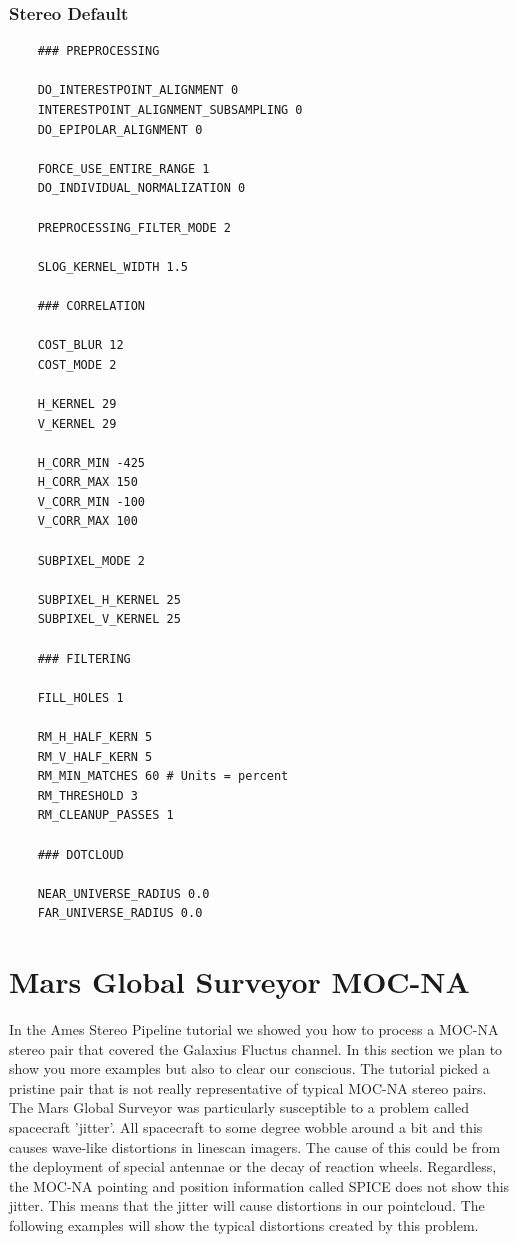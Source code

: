 \subsubsection*{Stereo Default}

\begin{verbatim}
    ### PREPROCESSING

    DO_INTERESTPOINT_ALIGNMENT 0
    INTERESTPOINT_ALIGNMENT_SUBSAMPLING 0
    DO_EPIPOLAR_ALIGNMENT 0

    FORCE_USE_ENTIRE_RANGE 1
    DO_INDIVIDUAL_NORMALIZATION 0

    PREPROCESSING_FILTER_MODE 2

    SLOG_KERNEL_WIDTH 1.5

    ### CORRELATION

    COST_BLUR 12
    COST_MODE 2

    H_KERNEL 29
    V_KERNEL 29

    H_CORR_MIN -425
    H_CORR_MAX 150
    V_CORR_MIN -100
    V_CORR_MAX 100

    SUBPIXEL_MODE 2

    SUBPIXEL_H_KERNEL 25
    SUBPIXEL_V_KERNEL 25

    ### FILTERING

    FILL_HOLES 1

    RM_H_HALF_KERN 5
    RM_V_HALF_KERN 5
    RM_MIN_MATCHES 60 # Units = percent
    RM_THRESHOLD 3
    RM_CLEANUP_PASSES 1

    ### DOTCLOUD

    NEAR_UNIVERSE_RADIUS 0.0
    FAR_UNIVERSE_RADIUS 0.0
\end{verbatim}

\section{Mars Global Surveyor MOC-NA}

In the Ames Stereo Pipeline tutorial we showed you how to process a
MOC-NA stereo pair that covered the Galaxius Fluctus channel. In this
section we plan to show you more examples but also to clear our
conscious. The tutorial picked a pristine pair that is not really
representative of typical MOC-NA stereo pairs. The Mars Global
Surveyor was particularly susceptible to a problem called spacecraft
'jitter'. All spacecraft to some degree wobble around a bit and this
causes wave-like distortions in linescan imagers. The cause of this
could be from the deployment of special antennae or the decay of
reaction wheels. Regardless, the MOC-NA pointing and position
information called SPICE does not show this jitter. This means that
the jitter will cause distortions in our pointcloud. The following
examples will show the typical distortions created by this problem.

